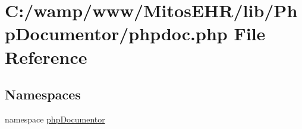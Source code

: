\hypertarget{phpdoc_8php}{\section{\-C\-:/wamp/www/\-Mitos\-E\-H\-R/lib/\-Php\-Documentor/phpdoc.php \-File \-Reference}
\label{phpdoc_8php}
}
\subsection*{\-Namespaces}
\begin{DoxyCompactItemize}
\item 
namespace \hyperlink{namespacephp_documentor}{php\-Documentor}
\end{DoxyCompactItemize}
